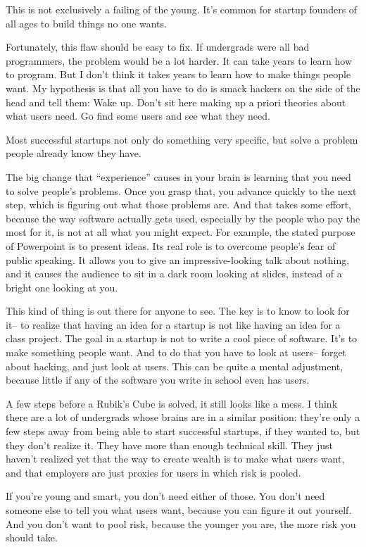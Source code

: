 This is not exclusively a failing of the young. It's common for startup
founders of all ages to build things no one wants.

Fortunately, this flaw should be easy to fix. If undergrads were all bad
programmers, the problem would be a lot harder. It can take years to
learn how to program. But I don't think it takes years to learn how to
make things people want. My hypothesis is that all you have to do is
smack hackers on the side of the head and tell them: Wake up. Don't sit
here making up a priori theories about what users need. Go find some
users and see what they need.

Most successful startups not only do something very specific, but solve
a problem people already know they have.

The big change that ``experience'' causes in your brain is learning that
you need to solve people's problems. Once you grasp that, you advance
quickly to the next step, which is figuring out what those problems are.
And that takes some effort, because the way software actually gets used,
especially by the people who pay the most for it, is not at all what you
might expect. For example, the stated purpose of Powerpoint is to
present ideas. Its real role is to overcome people's fear of public
speaking. It allows you to give an impressive-looking talk about
nothing, and it causes the audience to sit in a dark room looking at
slides, instead of a bright one looking at you.

This kind of thing is out there for anyone to see. The key is to know to
look for it-- to realize that having an idea for a startup is not like
having an idea for a class project. The goal in a startup is not to
write a cool piece of software. It's to make something people want. And
to do that you have to look at users-- forget about hacking, and just
look at users. This can be quite a mental adjustment, because little if
any of the software you write in school even has users.

A few steps before a Rubik's Cube is solved, it still looks like a mess.
I think there are a lot of undergrads whose brains are in a similar
position: they're only a few steps away from being able to start
successful startups, if they wanted to, but they don't realize it. They
have more than enough technical skill. They just haven't realized yet
that the way to create wealth is to make what users want, and that
employers are just proxies for users in which risk is pooled.

If you're young and smart, you don't need either of those. You don't
need someone else to tell you what users want, because you can figure it
out yourself. And you don't want to pool risk, because the younger you
are, the more risk you should take.

